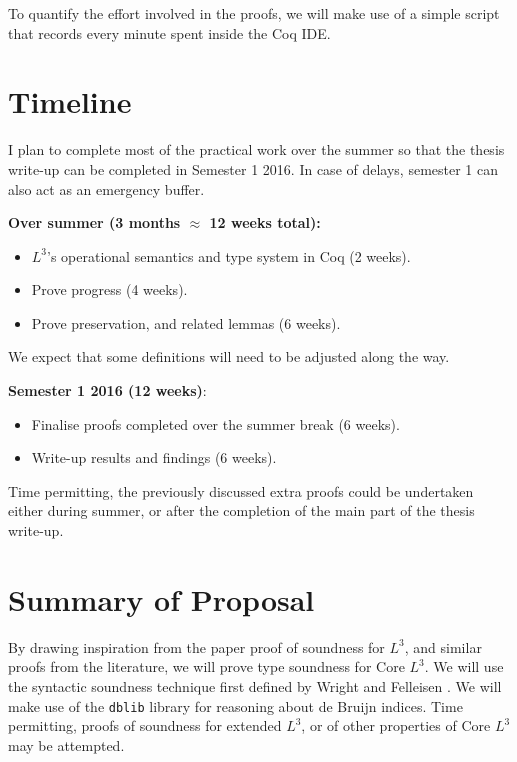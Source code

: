 \documentclass[]{unswthesis}
\begin{document}
To quantify the effort involved in the proofs, we will make use of a simple script that records every minute spent inside the Coq IDE.

\section{Timeline}
\label{sec:timeline}

I plan to complete most of the practical work over the summer so that the thesis write-up can be completed in Semester 1 2016. In case of delays, semester 1 can also act as an emergency buffer.

\textbf{Over summer (3 months $\approx$ 12 weeks total):}

\begin{itemize}
\item $L^3$'s operational semantics and type system in Coq (2 weeks).
\item Prove progress (4 weeks).
\item Prove preservation, and related lemmas (6 weeks).
\end{itemize}

We expect that some definitions will need to be adjusted along the way.

\textbf{Semester 1 2016 (12 weeks)}:

\begin{itemize}
\item Finalise proofs completed over the summer break (6 weeks).
\item Write-up results and findings (6 weeks).
\end{itemize}

Time permitting, the previously discussed extra proofs could be undertaken either during summer, or after the completion of the main part of the thesis write-up.

\section{Summary of Proposal}

By drawing inspiration from the paper proof of soundness for $L^3$, and similar proofs from the literature, we will prove type soundness for Core $L^3$. We will use the syntactic soundness technique first defined by Wright and Felleisen \cite{wright94}. We will make use of the \texttt{dblib} library \cite{dblib13} for reasoning about de Bruijn indices. Time permitting, proofs of soundness for extended $L^3$, or of other properties of Core $L^3$ may be attempted.
\end{document}
